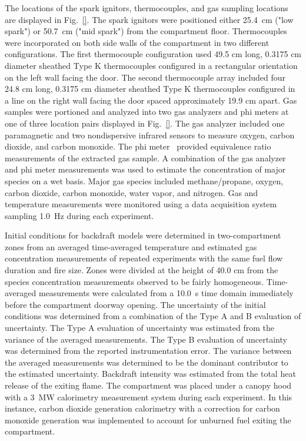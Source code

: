 \documentclass[12pt,letterpaper]{article}
\begin{document}
\begin{flushleft}
The locations of the spark ignitors, thermocouples, and gas sampling locations are displayed in Fig.~\ref{}. The spark ignitors were positioned either 25.4~cm ("low spark") or 50.7~cm ("mid spark") from the compartment floor. Thermocouples were incorporated on both side walls of the compartment in two different configurations. The first thermocouple configuration used 49.5 cm long, 0.3175 cm diameter sheathed Type K thermocouples configured in a rectangular orientation on the left wall facing the door. The second thermocouple array included four 24.8 cm long, 0.3175 cm diameter sheathed Type K thermocouples configured in a line on the right wall facing the door spaced approximately 19.9 cm apart. Gas samples were portioned and analyzed into two gas analyzers and phi meters at one of three location pairs displayed in Fig.~\ref{}. The gas analyzer included one paramagnetic and two nondispersive infrared sensors to measure oxygen, carbon dioxide, and carbon monoxide. The phi meter~\cite{} provided equivalence ratio measurements of the extracted gas sample. A combination of the gas analyzer and phi meter measurements was used to estimate the concentration of major species on a wet basis. Major gas species included methane/propane, oxygen, carbon dioxide, carbon monoxide, water vapor, and nitrogen. Gas and temperature measurements were monitored using a data acquisition system sampling 1.0~Hz during each experiment.

Initial conditions for backdraft models were determined in two-compartment zones from an averaged time-averaged temperature and estimated gas concentration measurements of repeated experiments with the same fuel flow duration and fire size. Zones were divided at the height of 40.0 cm from the species concentration measurements observed to be fairly homogeneous. Time-averaged measurements were calculated from a 10.0~s time domain immediately before the compartment doorway opening. The uncertainty of the initial conditions was determined from a combination of the Type A and B evaluation of uncertainty. The Type A evaluation of uncertainty was estimated from the variance of the averaged measurements. The Type B evaluation of uncertainty was determined from the reported instrumentation error. The variance between the averaged measurements was determined to be the dominant contributor to the estimated uncertainty.
Backdraft intensity was estimated from the total heat release of the exiting flame. The compartment was placed under a canopy hood with a 3~MW calorimetry measurement system during each experiment. In this instance, carbon dioxide generation calorimetry with a correction for carbon monoxide generation was implemented to account for unburned fuel exiting the compartment. 






\end{flushleft}
\end{document}
